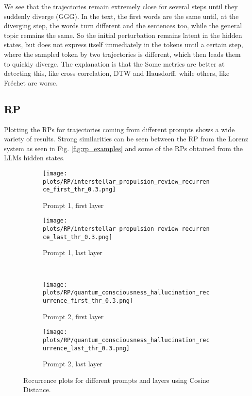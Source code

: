 \documentclass[a4paper,12pt]{article}
\begin{document}
We see that the trajectories remain extremely close for several steps until they suddenly diverge (GGG). In the text, the first words are the same until, at the diverging step, the words turn different and the sentences too, while the general topic remains the same. So the initial perturbation remains latent in the hidden states, but does not express itself immediately in the tokens until a certain step, where the sampled token by two trajectories is different, which then leads them to quickly diverge.
The explanation is that the 
Some metrics are better at detecting this, like cross correlation, DTW and Hausdorff, while others, like Fréchet are worse. 

\subsection{RP}
\label{subsec:rp_results}

Plotting the RPs for trajectories coming from different prompts shows a wide variety of results. Strong similarities can be seen between the RP from the Lorenz \cite{DeterministicNonperiodicFlow} system as seen in Fig. \ref{fig:rp_examples} and some of the RPs obtained from the LLMs hidden states. 

\begin{figure}[H]
    \centering
    \begin{subfigure}[b]{0.48\textwidth}
        \centering
        \texttt{[image: plots/RP/interstellar\_propulsion\_review\_recurrence\_first\_thr\_0.3.png]}
        \caption{Prompt 1, first layer}
    \end{subfigure}\hfill
    \begin{subfigure}[b]{0.48\textwidth}
        \centering
        \texttt{[image: plots/RP/interstellar\_propulsion\_review\_recurrence\_last\_thr\_0.3.png]}
        \caption{Prompt 1, last layer}
    \end{subfigure}
    \\[0.5em]
    \begin{subfigure}[b]{0.48\textwidth}
        \centering
        \texttt{[image: plots/RP/quantum\_consciousness\_hallucination\_recurrence\_first\_thr\_0.3.png]}
        \caption{Prompt 2, first layer}
    \end{subfigure}\hfill
    \begin{subfigure}[b]{0.48\textwidth}
        \centering
        \texttt{[image: plots/RP/quantum\_consciousness\_hallucination\_recurrence\_last\_thr\_0.3.png]}
        \caption{Prompt 2, last layer}
    \end{subfigure}
    \caption{Recurrence plots for different prompts and layers using Cosine Distance.}
    \label{fig:rp_comparison_layers}           
\end{figure}
\end{document}
